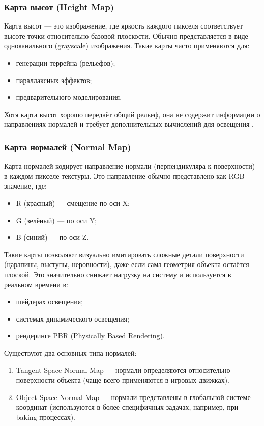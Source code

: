 \subsubsection{Карта высот (Height Map)}

Карта высот — это изображение, где яркость каждого пикселя соответствует высоте точки относительно базовой плоскости. Обычно представляется в виде одноканального (grayscale) изображения. Такие карты часто применяются для:
\begin{itemize}
	\item генерации террейна (рельефов);
	\item параллаксных эффектов;
	\item предварительного моделирования.
\end{itemize}

Хотя карта высот хорошо передаёт общий рельеф, она не содержит информации о направлениях нормалей и требует дополнительных вычислений для освещения \cite{martins2024}.
\subsubsection{Карта нормалей (Normal Map)}

Карта нормалей кодирует направление нормали (перпендикуляра к поверхности) в каждом пикселе текстуры. Это направление обычно представлено как RGB-значение, где:
\begin{itemize}
	\item R (красный) — смещение по оси X;
	\item G (зелёный) — по оси Y;
	\item B (синий) — по оси Z.
\end{itemize}

Такие карты позволяют визуально имитировать сложные детали поверхности (царапины, выступы, неровности), даже если сама геометрия объекта остаётся плоской. Это значительно снижает нагрузку на систему и используется в реальном времени в:
\begin{itemize}
	\item шейдерах освещения;
	\item системах динамического освещения;
	\item рендеринге PBR (Physically Based Rendering).
\end{itemize}

Существуют два основных типа нормалей:
\begin{enumerate}
	\item Tangent Space Normal Map — нормали определяются относительно поверхности объекта (чаще всего применяются в игровых движках).
	\item Object Space Normal Map — нормали представлены в глобальной системе координат (используются в более специфичных задачах, например, при baking-процессах).
\end{enumerate}
